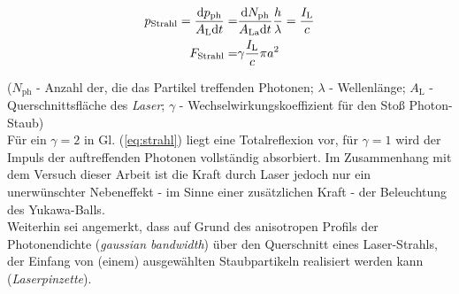 \documentclass[numbers=noenddot,a4paper,notitlepage,twoside,BCOR15mm]{scrbook}
\newcommand{\diff}{\textnormal{d}}
\newcommand{\ix}[1]{_\text{#1}}
\newcommand{\tilt}[1]{\textit{#1}}
\begin{document}
				\begin{align}
					p\ix{Strahl}=\frac{\diff p\ix{ph}}{A\ix{L}\diff t}=&\frac{\diff N\ix{ph}}{A\ix{La}\diff t}\frac{h}{\lambda}=\frac{I\ix{L}}{c} \nonumber \\
					F\ix{Strahl}=&\gamma\frac{I\ix{L}}{c}\pi a^2 \label{eq:strahl}
				\end{align}

			($N\ix{ph}$ - Anzahl der, die das Partikel treffenden Photonen; $\lambda$ - Wellenlänge; $A\ix{L}$ - Querschnittsfläche des \tilt{Laser}; $\gamma$ - Wechselwirkungskoeffizient für den Stoß Photon-Staub)\\
			Für ein $\gamma=2$ in Gl. (\ref{eq:strahl}) liegt eine Totalreflexion vor, für $\gamma=1$ wird der Impuls der auftreffenden Photonen vollständig absorbiert. Im Zusammenhang mit dem Versuch dieser Arbeit ist die Kraft durch Laser jedoch nur ein unerwünschter Nebeneffekt - im Sinne einer zusätzlichen Kraft - der Beleuchtung des Yukawa-Balls.\\
			Weiterhin sei angemerkt, dass auf Grund des anisotropen Profils der Photonendichte (\tilt{gaussian bandwidth}) über den Querschnitt eines Laser-Strahls, der Einfang von (einem) ausgewählten Staubpartikeln realisiert werden kann (\tilt{Laserpinzette}).

\end{document}
